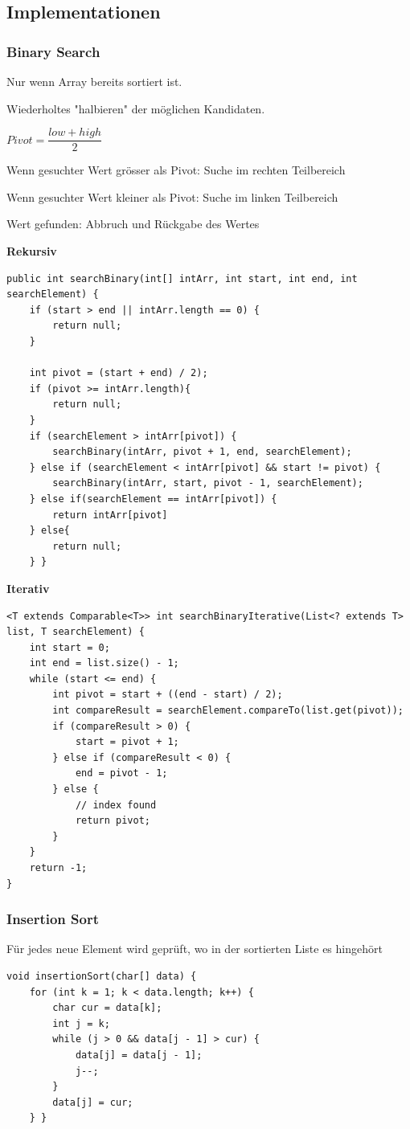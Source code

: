 \begin{multicols*}{4}
	\subsection{Implementationen}
		\subsubsection{Binary Search}
		Nur wenn Array bereits sortiert ist. 
		
		Wiederholtes "halbieren" der möglichen Kandidaten.
		
		$ Pivot = \dfrac{low + high}{2}  $
		
		Wenn gesuchter Wert grösser als Pivot: Suche im rechten Teilbereich
		
		Wenn gesuchter Wert kleiner als Pivot: Suche im linken Teilbereich
		
		Wert gefunden: Abbruch und Rückgabe des Wertes
		
		\columnbreak
		
		\textbf{Rekursiv}
			\begin{lstlisting}
public int searchBinary(int[] intArr, int start, int end, int searchElement) {
	if (start > end || intArr.length == 0) {
		return null;
	}

	int pivot = (start + end) / 2);
	if (pivot >= intArr.length){
		return null;
	}
	if (searchElement > intArr[pivot]) {
		searchBinary(intArr, pivot + 1, end, searchElement);
	} else if (searchElement < intArr[pivot] && start != pivot) {
		searchBinary(intArr, start, pivot - 1, searchElement);
	} else if(searchElement == intArr[pivot]) {
		return intArr[pivot]
	} else{
		return null;
	} }
			\end{lstlisting}
		
		\textbf{Iterativ}
			\begin{lstlisting}
<T extends Comparable<T>> int searchBinaryIterative(List<? extends T> list, T searchElement) { 
	int start = 0; 
	int end = list.size() - 1; 
	while (start <= end) { 
		int pivot = start + ((end - start) / 2); 
		int compareResult = searchElement.compareTo(list.get(pivot)); 
		if (compareResult > 0) { 
			start = pivot + 1; 
		} else if (compareResult < 0) { 
			end = pivot - 1; 
		} else { 
			// index found 
			return pivot; 
		} 
	} 
	return -1; 
} 
			\end{lstlisting}
		
		\subsubsection{Insertion Sort}
		Für jedes neue Element wird geprüft, wo in der sortierten Liste es hingehört
			\begin{lstlisting}
void insertionSort(char[] data) {
	for (int k = 1; k < data.length; k++) {
		char cur = data[k];
		int j = k;
		while (j > 0 && data[j - 1] > cur) {
			data[j] = data[j - 1];
			j--;
		}
		data[j] = cur;
	} }
			\end{lstlisting}
		

\end{multicols*}
